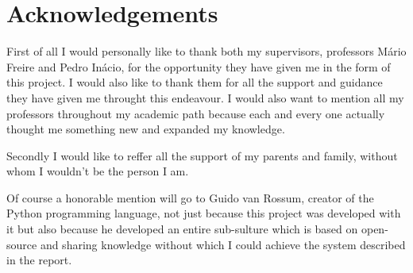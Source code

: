 \chapter*{Acknowledgements}
\label{chap:ack}

First of all I would personally like to thank both my supervisors, professors
Mário Freire and Pedro Inácio, for the opportunity they have given me in the
form of this project. I would also like to thank them for all the support and
guidance they have given me throught this endeavour. I would also want to
mention all my professors throughout my academic path because each and every one
actually thought me something new and expanded my knowledge.

Secondly I would like to reffer all the support of my parents and family,
without whom I wouldn't be the person I am.

Of course a honorable mention will go to Guido van Rossum, creator of the Python
programming language, not just because this project was developed with it but
also because he developed an entire sub-sulture which is based on open-source
and sharing knowledge without which I could achieve the system described in the
report.
